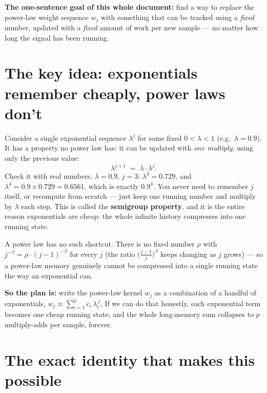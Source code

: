 \documentclass[11pt]{article}
\begin{document}
\begin{keyidea}
\textbf{The one-sentence goal of this whole document:} find a way to replace the power-law weight sequence $w_j$ with something that can be tracked using a \emph{fixed} number, updated with a \emph{fixed} amount of work per new sample --- no matter how long the signal has been running.
\end{keyidea}

\section{The key idea: exponentials remember cheaply, power laws don't}

Consider a single exponential sequence $\lambda^j$ for some fixed $0<\lambda<1$ (e.g.\ $\lambda=0.9$). It has a property no power law has: it can be updated with \emph{one multiply}, using only the previous value:
\[
\lambda^{j+1} \;=\; \lambda \cdot \lambda^{j}.
\]
Check it with real numbers: $\lambda=0.9$, $j=3$: $\lambda^3 = 0.729$, and $\lambda^4 = 0.9\times 0.729 = 0.6561$, which is exactly $0.9^4$. You never need to remember $j$ itself, or recompute from scratch --- just keep one running number and multiply by $\lambda$ each step. This is called the \textbf{semigroup property}, and it is the entire reason exponentials are cheap: the whole infinite history compresses into one running state.

A power law has no such shortcut. There is no fixed number $\rho$ with $j^{-\beta} = \rho \cdot (j-1)^{-\beta}$ for every $j$ (the ratio $\big(\frac{j-1}{j}\big)^\beta$ keeps changing as $j$ grows) --- so a power-law memory genuinely cannot be compressed into a single running state the way an exponential can.

\begin{recap}
\textbf{So the plan is:} write the power-law kernel $w_j$ as a combination of a handful of exponentials, $w_j \approx \sum_{i=1}^p c_i\,\lambda_i^{\,j}$. If we can do that honestly, each exponential term becomes one cheap running state, and the whole long-memory sum collapses to $p$ multiply-adds per sample, forever.
\end{recap}

\section{The exact identity that makes this possible}
\end{document}

